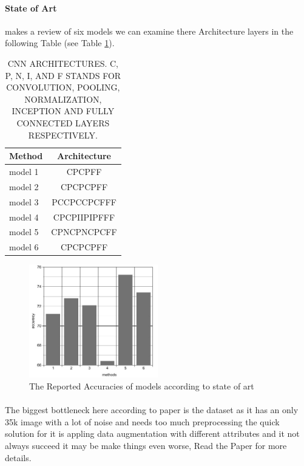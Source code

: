 \paragraph{State of Art} makes a review of six models we can examine there Architecture layers in the following Table (see Table \ref{models}).
\begin{table}
	\begin{center}
		\label{models}
		\caption{CNN ARCHITECTURES. C, P, N, I, AND F STANDS FOR CONVOLUTION, POOLING, NORMALIZATION, INCEPTION AND FULLY CONNECTED LAYERS RESPECTIVELY. \newline}
		\begin{tabular}{l|c}
			\textbf{Method} & \textbf{Architecture} \\
			\hline
			model 1\cite{method_1} & CPCPFF \\
			model 2\cite{method_2} & CPCPCPFF \\
			model 3\cite{method_3} & PCCPCCPCFFF \\
			model 4\cite{method_4} & CPCPIIPIPFFF \\
			model 5\cite{method_5} & CPNCPNCPCFF \\						
			model 6\cite{method_6} & CPCPCPFF \\
		\end{tabular}
	\end{center}
\end{table}
\begin{figure}
	\centering
	\includegraphics[width=0.5\textwidth]{images/stateoart_acc.png}
	\caption{The Reported Accuracies of models according to state of art}
\end{figure}
\paragraph{}
The biggest bottleneck here according to paper is the dataset as it has an only 35k image with a lot of noise and needs too much preprocessing the quick solution for it is appling data augmentation with different attributes and it not always succeed it may be make things even worse, Read the Paper for more details\cite{state_of_art}.
